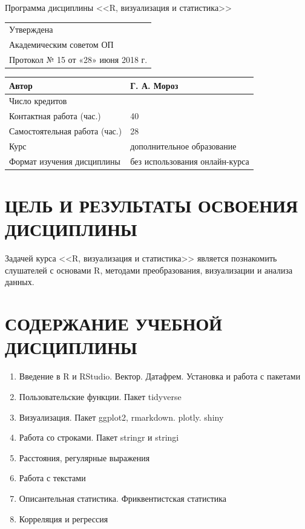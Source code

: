 \documentclass[a4paper]{article}
\begin{document}
\begin{center}
{\Large Программа дисциплины <<R, визуализация и статистика>>}
\end{center}
\begin{flushright}
\begin{tabular}{l}
Утверждена                          \\
Академическим советом ОП            \\
Протокол № 15 от  «28» июня 2018 г.
\end{tabular}
\end{flushright}
\begin{center}
\begin{tabular}{|l|l|}
\hline
Автор                         & Г. А. Мороз                    \\ \hline
Число кредитов                &                               \\ \hline
Контактная работа (час.)      &                   40           \\ \hline
Самостоятельная работа (час.) &                 28             \\ \hline
Курс                          & дополнительное образование \\ \hline
Формат изучения дисциплины    & без использования онлайн-курса \\ \hline
\end{tabular}
\end{center}
\section{ЦЕЛЬ И РЕЗУЛЬТАТЫ ОСВОЕНИЯ ДИСЦИПЛИНЫ}
Задачей курса <<R, визуализация и статистика>> является познакомить слушателей с основами R, методами преобразования, визуализации и анализа данных.
\section{СОДЕРЖАНИЕ УЧЕБНОЙ ДИСЦИПЛИНЫ}
\begin{enumerate}
\item Введение в R и RStudio. Вектор. Датафрем. Установка и работа с пакетами
\item Пользовательские функции. Пакет tidyverse
\item Визуализация. Пакет ggplot2, rmarkdown. plotly. shiny
\item Работа со строками. Пакет stringr и stringi
\item Расстояния, регулярные выражения
\item Работа с текстами
\item Описантельная статистика. Фриквентистская статистика
\item Корреляция и регрессия
\end{enumerate}
\end{document}
